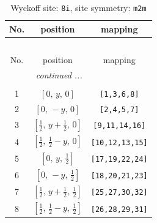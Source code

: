 \documentclass[fleqn,8pt]{jsarticle}
\begin{document}
\begin{longtable}{ccc}
\caption{Wyckoff site: {\tt 8i}, site symmetry: {\tt m2m}}
 \\
 \hline \hline
No. & position & mapping \\ \hline \endfirsthead

\multicolumn{2}{l}{\tablename\ \thetable{}} \\
 \hline \hline
No. & position & mapping \\ \hline \endhead

 \hline \hline
\multicolumn{2}{r}{\footnotesize\it continued ...} \\ \endfoot

 \hline \hline
\multicolumn{2}{r}{} \\ \endlastfoot

1 & $\left[ 0,\, y,\, 0 \right]$ & {\tt [1,3,6,8]} \\ \hline
2 & $\left[ 0,\, - y,\, 0 \right]$ & {\tt [2,4,5,7]} \\ \hline
3 & $\left[ \frac{1}{2},\, y + \frac{1}{2},\, 0 \right]$ & {\tt [9,11,14,16]} \\ \hline
4 & $\left[ \frac{1}{2},\, \frac{1}{2} - y,\, 0 \right]$ & {\tt [10,12,13,15]} \\ \hline
5 & $\left[ 0,\, y,\, \frac{1}{2} \right]$ & {\tt [17,19,22,24]} \\ \hline
6 & $\left[ 0,\, - y,\, \frac{1}{2} \right]$ & {\tt [18,20,21,23]} \\ \hline
7 & $\left[ \frac{1}{2},\, y + \frac{1}{2},\, \frac{1}{2} \right]$ & {\tt [25,27,30,32]} \\ \hline
8 & $\left[ \frac{1}{2},\, \frac{1}{2} - y,\, \frac{1}{2} \right]$ & {\tt [26,28,29,31]} \\
\end{longtable}
\renewcommand{\arraystretch}{1.2}
\end{document}
